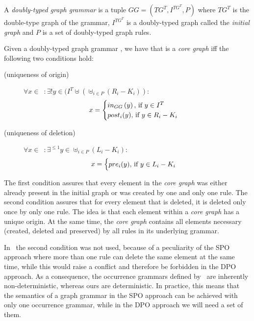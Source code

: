 \begin{definition} A \emph{doubly-typed graph grammar} is a tuple $GG = \left(TG^T, I^{TG^T},P \right)$ where $TG^T$ is the double-type graph of the grammar, $I^{TG^T}$ is a doubly-typed graph called the \emph{initial graph} and $P$ is a set of doubly-typed graph rules.

\end{definition}


\begin{definition}\label{def:core-graph} Given a doubly-typed graph grammar \doublyTypedGraphGrammarCore{}, we have that \coreGraph{} is a \emph{core graph} iff the following two conditions hold:

\begin{description}

  \item[(uniqueness of origin)] \mbox{$\forall x \in$ \coreGraph $: \exists! y \in (I^T \uplus (\uplus_{i \in P} (R_i - K_i))$}:
\[ x =
    \begin{cases}
      in_{GG}\parens{y},$ if $y \in I^T\\
      post_i(y),$ if $y \in R_i - K_i\\
    \end{cases}
   \]

 \item[(uniqueness of deletion)] \mbox{$\forall x \in$ \coreGraph $: \exists^{\leq1} y \in \uplus_{i \in P} (L_i - K_i)$}:
\[ x =
    \begin{cases}
      pre_i(y),$ if $y \in L_i - K_i\\
    \end{cases}
   \]\end{description}

\end{definition}
  The first condition assures that every element in the \emph{core graph} was either already present in the initial graph or was created by one and only one rule. The second condition assures that for every element that is deleted, it is deleted only once by only one rule. The idea is that each element within a \emph{core graph} has a unique origin. At the same time, the \emph{core graph} contains all elements necessary (created, deleted and preserved) by all rules in its underlying grammar. 
  
  In~\cite{Ribeiro1996} the second condition was not used, because of a peculiarity of the SPO approach where more than one rule can delete the same element at the same time, while this would raise a conflict and therefore be forbidden in the DPO approach. As a consequence, the occurrence grammars defined by~\cite{Ribeiro1996} are inherently non-deterministic, whereas ours are deterministic.  In practice, this means that the semantics of a graph grammar in the SPO approach can be achieved with only one occurrence grammar, while in the DPO approach we will need a set of them.

